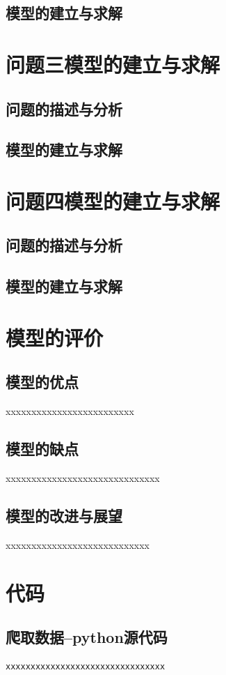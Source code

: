 \documentclass{whutmod}
\begin{document}
	\subsection{模型的建立与求解}
	

	\section{问题三模型的建立与求解}
	
	
	\subsection{问题的描述与分析}

	\subsection{模型的建立与求解}

	\section{问题四模型的建立与求解}
	
	\subsection{问题的描述与分析}
	
	\subsection{模型的建立与求解}



	\section{模型的评价}
	\subsection{模型的优点}
xxxxxxxxxxxxxxxxxxxxxxxxx
	
	\subsection{模型的缺点}
xxxxxxxxxxxxxxxxxxxxxxxxxxxxxx


	\subsection{模型的改进与展望}
xxxxxxxxxxxxxxxxxxxxxxxxxxxx
	\newpage	%
	
	\printbibliography[title = {参考文献}]	%
	
	\newpage
	\appendix %
\section{代码}
\subsection{爬取数据--python源代码}
\begin{lstlisting}[language=python]%这里修改语言
xxxxxxxxxxxxxxxxxxxxxxxxxxxxxxxx
\end{lstlisting}
\end{document}
